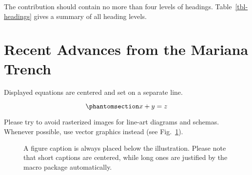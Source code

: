 \documentclass[runningheads]{llncs}
\begin{document}
The contribution should contain no more than four levels of headings.
Table~\ref{tbl-headings} gives a summary of all heading levels.

\begin{table}[t]

\caption{\label{tbl-headings}Table captions should be placed above the
tables.}


\end{table}%

\section{Recent Advances from the Mariana
Trench}\label{recent-advances-from-the-mariana-trench}

Displayed equations are centered and set on a separate line.

\begin{equation}\phantomsection\label{eq-linear}{
x + y = z
}\end{equation}

Please try to avoid rasterized images for line-art diagrams and schemas.
Whenever possible, use vector graphics instead (see
Fig.~\ref{fig-duck}).

\begin{figure}[t]


\caption{\label{fig-duck}A figure caption is always placed below the
illustration. Please note that short captions are centered, while long
ones are justified by the macro package automatically.}

\end{figure}%
\end{document}
